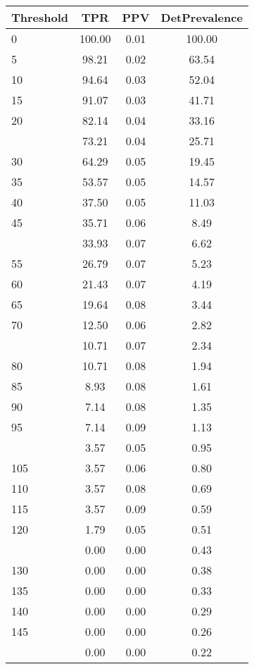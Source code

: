 \begin{table}[ht]
\centering
\begin{tabular}{lccc}
  \toprule
Threshold & TPR & PPV & DetPrevalence \\ 
  \midrule
0 & 100.00 & 0.01 & 100.00 \\ 
  5 & 98.21 & 0.02 & 63.54 \\ 
  10 & 94.64 & 0.03 & 52.04 \\ 
  15 & 91.07 & 0.03 & 41.71 \\ 
  20 & 82.14 & 0.04 & 33.16 \\ 
   \addlinespace
25 & 73.21 & 0.04 & 25.71 \\ 
  30 & 64.29 & 0.05 & 19.45 \\ 
  35 & 53.57 & 0.05 & 14.57 \\ 
  40 & 37.50 & 0.05 & 11.03 \\ 
  45 & 35.71 & 0.06 & 8.49 \\ 
   \addlinespace
50 & 33.93 & 0.07 & 6.62 \\ 
  55 & 26.79 & 0.07 & 5.23 \\ 
  60 & 21.43 & 0.07 & 4.19 \\ 
  65 & 19.64 & 0.08 & 3.44 \\ 
  70 & 12.50 & 0.06 & 2.82 \\ 
   \addlinespace
75 & 10.71 & 0.07 & 2.34 \\ 
  80 & 10.71 & 0.08 & 1.94 \\ 
  85 & 8.93 & 0.08 & 1.61 \\ 
  90 & 7.14 & 0.08 & 1.35 \\ 
  95 & 7.14 & 0.09 & 1.13 \\ 
   \addlinespace
100 & 3.57 & 0.05 & 0.95 \\ 
  105 & 3.57 & 0.06 & 0.80 \\ 
  110 & 3.57 & 0.08 & 0.69 \\ 
  115 & 3.57 & 0.09 & 0.59 \\ 
  120 & 1.79 & 0.05 & 0.51 \\ 
   \addlinespace
125 & 0.00 & 0.00 & 0.43 \\ 
  130 & 0.00 & 0.00 & 0.38 \\ 
  135 & 0.00 & 0.00 & 0.33 \\ 
  140 & 0.00 & 0.00 & 0.29 \\ 
  145 & 0.00 & 0.00 & 0.26 \\ 
   \addlinespace
150 & 0.00 & 0.00 & 0.22 \\ 

\end{tabular}
\end{table}
